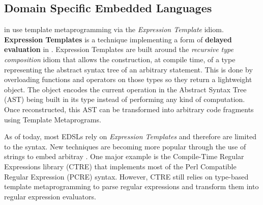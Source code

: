 \documentclass[../main]{subfiles}
\begin{document}


\subsection{
  \cpp Domain Specific Embedded Languages
}

\dsels in \cpp use template metaprogramming via the \textit{Expression
Template} idiom.
\textbf{Expression Templates} \cite{veldhuizen:1995,vandevoorde:2002} is a
technique implementing a form of \textbf{delayed evaluation} in
\cpp \cite{spinellis:2001}. Expression Templates are built around the
\textit{recursive type composition} idiom \cite{jarvi:1998} that allows the
construction, at compile time, of a type representing the abstract syntax tree
of an arbitrary statement. This is done by overloading functions and operators
on those types so they return a lightweight object.
The object encodes the current operation in the Abstract Syntax Tree
(AST) being built in its type instead of performing any kind of computation.
Once reconstructed, this AST can be transformed into arbitrary code fragments
using Template Metaprograms.

As of today, most \cpp EDSLs rely on \textit{Expression Templates} and therefore
are limited to the \cpp syntax. New techniques are becoming more popular through
the use of \constexpr strings to embed arbitray \dsels. One major example is
the Compile-Time Regular Expressions library (CTRE) \cite{ctre} that implements
most of the Perl Compatible Regular Expression (PCRE) syntax. However, CTRE
still relies on type-based template metaprogramming to parse regular expressions
and transform them into regular expression evaluators.


\end{document}
